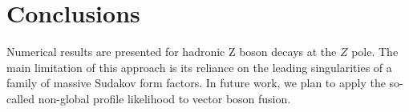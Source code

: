 \section{Conclusions}\label{sec:conclusions}

Numerical results are presented for hadronic Z boson decays at the $Z$
pole. The main limitation of this approach is its reliance on the
leading singularities of a family of massive Sudakov form factors. In
future work, we plan to apply the so-called non-global profile
likelihood to vector boson fusion.

